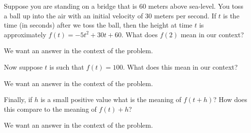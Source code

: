 \begin{question} 
Suppose you are standing on a bridge that is 60 meters above
sea-level. You toss a ball up into the air with an initial velocity of
30 meters per second.  If $t$ is the time (in seconds) after we toss
the ball, then the height at time $t$ is approximately $f(t) = -5 t^2
+30t+60$. What does $f(2)$ mean in our context?
\begin{solution}
\begin{hint}
We want an answer in the context of the problem. 
\end{hint}
\end{solution}
Now suppose $t$ is such that $f(t) = 100$. What does this mean in our
context?
\begin{solution}
\begin{hint}
We want an answer in the context of the problem. 
\end{hint}
\end{solution}
Finally, if $h$ is a small positive value what is the meaning of
$f(t+h)$? How does this compare to the meaning of $f(t)+h$?
\begin{solution}
\begin{hint}
We want an answer in the context of the problem. 
\end{hint}
\end{solution}
\end{question}


